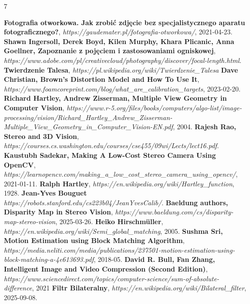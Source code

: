\documentclass[magisterska]{pracadypl}
\begin{document}
\renewcommand{\listfigurename}{Spis rysunków}
\listoffigures

\begin{thebibliography}{7}
\raggedright

 \textbf{Fotografia otworkowa. Jak zrobić zdjęcie bez specjalistycznego aparatu fotograficznego?}, \textit{https://gaudemater.pl/fotografia-otworkowa/}, 2021-04-23.
 \textbf{Shawn Ingersoll, Derek Boyd, Kilen Murphy, Khara Plicanic, Anna Goellner, Zapoznanie z pojęciem i zastosowaniami ogniskowej}, \textit{https://www.adobe.com/pl/creativecloud/photography/discover/focal-length.html}.
 \textbf{Twierdzenie Talesa}, \textit{https://pl.wikipedia.org/wiki/Twierdzenie\_Talesa} 
 \textbf{Dave Christian, Brown's Distortion Model and How To Use It}, \textit{https://www.foamcoreprint.com/blog/what\_are\_calibration\_targets}, 2023-02-20.
 \textbf{Richard Hartley, Andrew Zisserman, Multiple View Geometry in Computer Vision}, \textit{https://www.r-5.org/files/books/computers/algo-list/image-processing/vision/Richard\_Hartley\_Andrew\_Zisserman-Multiple\_View\_Geometry\_in\_Computer\_Vision-EN.pdf}, 2004.
 \textbf{Rajesh Rao, Stereo and 3D Vision}, \textit{https://courses.cs.washington.edu/courses/cse455/09wi/Lects/lect16.pdf}.
 \textbf{Kaustubh Sadekar, Making A Low-Cost Stereo Camera Using OpenCV}, \textit{https://learnopencv.com/making\_a\_low\_cost\_stereo\_camera\_using\_opencv/}, 2021-01-11.
 \textbf{Ralph Hartley}, \textit{https://en.wikipedia.org/wiki/Hartley\_function}, 1928.
 \textbf{Jean-Yves Bouguet} \textit{https://robots.stanford.edu/cs223b04/JeanYvesCalib/}.
 \textbf{Baeldung authors, Disparity Map in Stereo Vision}, \textit{https://www.baeldung.com/cs/disparity-map-stereo-vision}, 2025-03-26.
 \textbf{Heiko Hirschmüller}, \textit{https://en.wikipedia.org/wiki/Semi\_global\_matching}, 2005.
 \textbf{Sushma Sri, Motion Estimation using Block Matching Algorithm}, \textit{https://media.neliti.com/media/publications/237501-motion-estimation-using-block-matching-a-4e613693.pdf}, 2018-05.
 \textbf{David R. Bull, Fan Zhang, Intelligent Image and Video Compression (Second Edition)}, \textit{https://www.sciencedirect.com/topics/computer-science/sum-of-absolute-difference}, 2021
 \textbf{Filtr Bilateralny}, \textit{https://en.wikipedia.org/wiki/Bilateral\_filter}, 2025-09-08.

\end{thebibliography}
\end{document}
